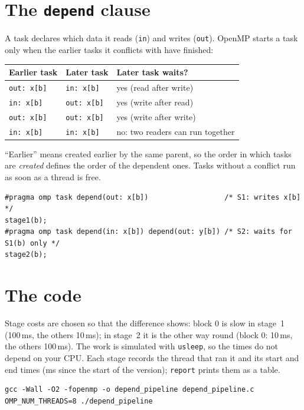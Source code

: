 \documentclass[11pt,a4paper]{article}
\let\origtexttt\texttt
\renewcommand{\texttt}[1]{\textcolor{black!60}{\origtexttt{#1}}}
\begin{document}
\section{The \texttt{depend} clause}
A task declares which data it reads (\texttt{in}) and writes (\texttt{out}). OpenMP starts a
task only when the earlier tasks it conflicts with have finished:
\begin{center}
\small
\begin{tabular}{@{}lll@{}}
\toprule
Earlier task & Later task & Later task waits? \\ \midrule
\texttt{out: x[b]} & \texttt{in: x[b]}  & yes (read after write) \\
\texttt{in: x[b]}  & \texttt{out: x[b]} & yes (write after read) \\
\texttt{out: x[b]} & \texttt{out: x[b]} & yes (write after write) \\
\texttt{in: x[b]}  & \texttt{in: x[b]}  & no: two readers can run together \\
\bottomrule
\end{tabular}
\end{center}
``Earlier'' means created earlier by the same parent, so the order in which tasks are
\emph{created} defines the order of the dependent ones. Tasks without a conflict run as soon
as a thread is free.

\begin{lstlisting}
#pragma omp task depend(out: x[b])                  /* S1: writes x[b] */
stage1(b);
#pragma omp task depend(in: x[b]) depend(out: y[b]) /* S2: waits for S1(b) only */
stage2(b);
\end{lstlisting}

\section{The code}
Stage costs are chosen so that the difference shows: block 0 is slow in stage~1 (100\,ms,
the others 10\,ms); in stage~2 it is the other way round (block 0: 10\,ms, the others
100\,ms). The work is simulated with \texttt{usleep}, so the times do not depend on your CPU.
Each stage records the thread that ran it and its start and end times (ms since the start of
the version); \texttt{report} prints them as a table.



\begin{lstlisting}[style=sh]
gcc -Wall -O2 -fopenmp -o depend_pipeline depend_pipeline.c
OMP_NUM_THREADS=8 ./depend_pipeline
\end{lstlisting}
\end{document}
